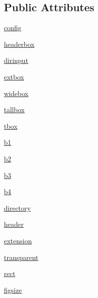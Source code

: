 \subsection*{Public Attributes}
\begin{DoxyCompactItemize}
\item 
\hyperlink{class_uni_dec_1_1unidec__modules_1_1miscwindows_1_1_save_figure_dialog_afeeb42cc44d011893f46da5fca95632f}{config}
\item 
\hyperlink{class_uni_dec_1_1unidec__modules_1_1miscwindows_1_1_save_figure_dialog_a38f5e4a385c43fc9e5696db20f62f65a}{headerbox}
\item 
\hyperlink{class_uni_dec_1_1unidec__modules_1_1miscwindows_1_1_save_figure_dialog_acc07d85026627a64c8e619a037eeb6ab}{dirinput}
\item 
\hyperlink{class_uni_dec_1_1unidec__modules_1_1miscwindows_1_1_save_figure_dialog_a71e03797b14e8da8154f7308894ed57d}{extbox}
\item 
\hyperlink{class_uni_dec_1_1unidec__modules_1_1miscwindows_1_1_save_figure_dialog_a0a730715967ba81f0c9d4cf6b19d175b}{widebox}
\item 
\hyperlink{class_uni_dec_1_1unidec__modules_1_1miscwindows_1_1_save_figure_dialog_a8e78131b1ef9916493c4abc9c0913f0f}{tallbox}
\item 
\hyperlink{class_uni_dec_1_1unidec__modules_1_1miscwindows_1_1_save_figure_dialog_a7b27679a44e0798558629dd71a0670df}{tbox}
\item 
\hyperlink{class_uni_dec_1_1unidec__modules_1_1miscwindows_1_1_save_figure_dialog_aad7424b2c93fbff662e79a275edec7b9}{b1}
\item 
\hyperlink{class_uni_dec_1_1unidec__modules_1_1miscwindows_1_1_save_figure_dialog_a9209881700eb559c083c6319a56cdd54}{b2}
\item 
\hyperlink{class_uni_dec_1_1unidec__modules_1_1miscwindows_1_1_save_figure_dialog_a06125484846a4215ec2e383c5ef0bd14}{b3}
\item 
\hyperlink{class_uni_dec_1_1unidec__modules_1_1miscwindows_1_1_save_figure_dialog_ac9fd37ab61fe88f44a9d051bf35cfd77}{b4}
\item 
\hyperlink{class_uni_dec_1_1unidec__modules_1_1miscwindows_1_1_save_figure_dialog_a79d57afa27ad6028306f0aba6e935dca}{directory}
\item 
\hyperlink{class_uni_dec_1_1unidec__modules_1_1miscwindows_1_1_save_figure_dialog_ae03badc4cfa8c48067cebd720ac52454}{header}
\item 
\hyperlink{class_uni_dec_1_1unidec__modules_1_1miscwindows_1_1_save_figure_dialog_a943cf4bcb3657c22c74c50772d36732e}{extension}
\item 
\hyperlink{class_uni_dec_1_1unidec__modules_1_1miscwindows_1_1_save_figure_dialog_a3f853a8619acdb8f4e176bb6698a15b8}{transparent}
\item 
\hyperlink{class_uni_dec_1_1unidec__modules_1_1miscwindows_1_1_save_figure_dialog_aa30801a7c9e5a4da6ece9f3eb92dbba8}{rect}
\item 
\hyperlink{class_uni_dec_1_1unidec__modules_1_1miscwindows_1_1_save_figure_dialog_a360ebe2b9eef990e5fb84f723126cc1d}{figsize}
\end{DoxyCompactItemize}


